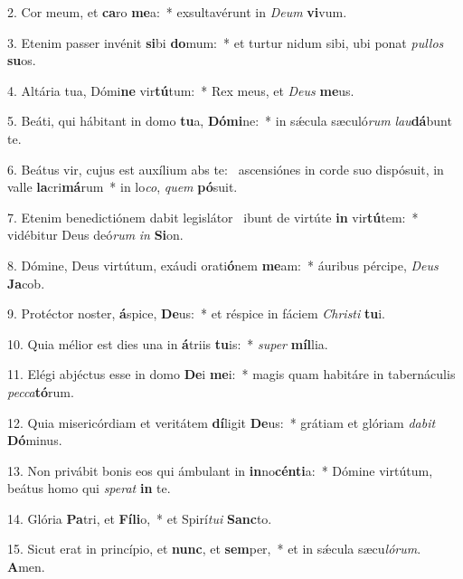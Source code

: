 2. Cor meum, et \textbf{ca}ro \textbf{me}a:~*  exsultavérunt in \textit{De}\textit{um} \textbf{vi}vum.\

3. Etenim passer invénit \textbf{si}bi \textbf{do}mum:~*  et turtur nidum sibi, ubi ponat \textit{pul}\textit{los} \textbf{su}os.\

4. Altária tua, Dómi\textbf{ne} vir\textbf{tú}tum:~*  Rex meus, et \textit{De}\textit{us} \textbf{me}us.\

5. Beáti, qui hábitant in domo \textbf{tu}a, \textbf{Dó}\textbf{mi}ne:~*  in sǽcula sæculó\textit{rum} \textit{lau}\textbf{dá}bunt te.\

6. Beátus vir, cujus est auxílium abs te: \dag\  ascensiónes in corde suo dispósuit, in valle \textbf{la}cri\textbf{má}rum~*  in lo\textit{co}, \textit{quem} \textbf{pó}suit.\

7. Etenim benedictiónem dabit legislátor \dag\  ibunt de virtúte \textbf{in} vir\textbf{tú}tem:~*  vidébitur Deus deó\textit{rum} \textit{in} \textbf{Si}on.\

8. Dómine, Deus virtútum, exáudi orati\textbf{ó}nem \textbf{me}am:~*  áuribus pércipe, \textit{De}\textit{us} \textbf{Ja}cob.\

9. Protéctor noster, \textbf{á}spice, \textbf{De}us:~*  et réspice in fáciem \textit{Chris}\textit{ti} \textbf{tu}i.\

10. Quia mélior est dies una in \textbf{á}triis \textbf{tu}is:~*  \textit{su}\textit{per} \textbf{míl}lia.\

11. Elégi abjéctus esse in domo \textbf{De}i \textbf{me}i:~*  magis quam habitáre in tabernáculis \textit{pec}\textit{ca}\textbf{tó}rum.\

12. Quia misericórdiam et veritátem \textbf{dí}ligit \textbf{De}us:~*  grátiam et glóriam \textit{da}\textit{bit} \textbf{Dó}minus.\

13. Non privábit bonis eos qui ámbulant in \textbf{in}no\textbf{cén}\textbf{ti}a:~*  Dómine virtútum, beátus homo qui \textit{spe}\textit{rat} \textbf{in} te.\

14. Glória \textbf{Pa}tri, et \textbf{Fí}\textbf{li}o,~*  et Spirí\textit{tu}\textit{i} \textbf{Sanc}to.\

15. Sicut erat in princípio, et \textbf{nunc}, et \textbf{sem}per,~*  et in sǽcula sæcu\textit{ló}\textit{rum}. \textbf{A}men.\

